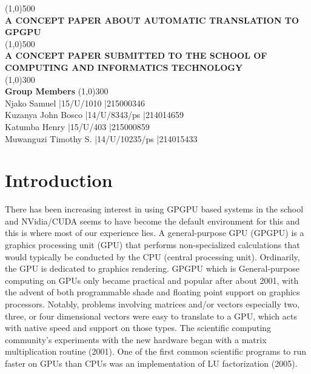 \documentclass{report}
\begin{document}
\begin{titlepage}
    \begin{center}
\line(1,0){500}\\
\huge{\bfseries A CONCEPT PAPER ABOUT   AUTOMATIC TRANSLATION TO GPGPU\\}
\line(1,0){500}\\
[0.25in]
\huge{\bfseries A CONCEPT PAPER SUBMITTED TO THE SCHOOL OF COMPUTING AND INFORMATICS TECHNOLOGY}\\ 
[1.5in] 
\line(1,0){300}\\ 
\huge{\bfseries Group Members}
\line(1,0){300}\\ 
Njako Samuel	|15/U/1010	|215000346\\
Kuzanya John Bosco	|14/U/8343/ps	|214014659\\
Katumba Henry	|15/U/403	|215000859\\
Muwanguzi Timothy S. |14/U/10235/ps	|214015433\\


    \end{center}
\end{titlepage} 
       

\section{Introduction}   
There has been increasing interest in using GPGPU based systems in the school and NVidia/CUDA seems to have become the default environment for this and this is where most of our experience lies. A general-purpose GPU (GPGPU) is a graphics processing unit (GPU) that performs non-specialized calculations that would typically be conducted by the CPU (central processing unit). Ordinarily, the GPU is dedicated to graphics rendering. GPGPU which is General-purpose computing on GPUs only became practical and popular after about 2001, with the advent of both programmable shade and floating point support on graphics processors. Notably, problems involving matrices and/or vectors especially two, three, or four dimensional vectors were easy to translate to a GPU, which acts with native speed and support on those types. The scientific computing community's experiments with the new hardware began with a matrix multiplication routine (2001). One of the first common scientific programs to run faster on GPUs than CPUs was an implementation of LU factorization (2005).
   
\end{document}
